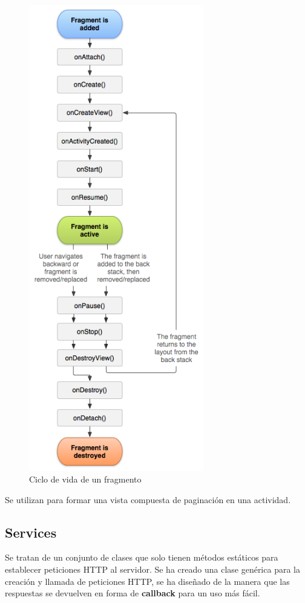 \begin{figure}[H]
    \centering
    \includegraphics[width=3in]{figures/chapter-4/fragment_lifecycle.png}
    \caption{Ciclo de vida de un fragmento}
\end{figure}

Se utilizan para formar una vista compuesta de paginación en una actividad. 

\subsection{Services}
\label{makereference4.3.6}
Se tratan de un conjunto de clases que solo tienen métodos estáticos para establecer peticiones HTTP al servidor. Se ha creado una clase genérica para la creación y llamada de peticiones HTTP, se ha diseñado de la manera que las respuestas se devuelven en forma de \textbf{callback} para un uso más fácil.

